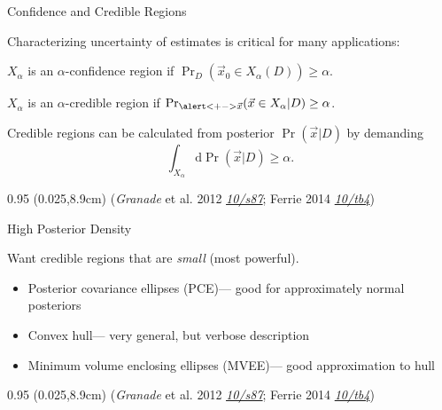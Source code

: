 \documentclass[xcolor=dvipsnames, compress]{beamer}
\renewcommand\UrlFont{\color{red}\rmfamily\itshape}
\newcommand{\shortdoi}[1]{\href{http://doi.org/#1}{\UrlFont 10/#1}}
\newcommand{\dd}{\mathrm{d}}
\newcommand{\bottomnote}[1]{
  \begin{textblock*}{0.95\paperwidth} (0.025\paperwidth,8.9cm)
    {\tiny \hfill #1}
  \end{textblock*}
}
\begin{document}
\begin{frame}{Confidence and Credible Regions}

    Characterizing uncertainty of estimates is critical
    for many applications:

    \begin{definition}
      $X_\alpha$ is an $\alpha$-confidence region if $\Pr_D(\vec{x}_0 \in X_\alpha(D)) \ge \alpha$.
    \end{definition}

    \begin{definition}
      $X_\alpha$ is an $\alpha$-credible region if $\Pr_{\alert<+->{\vec{x}}}(\vec{x} \in X_\alpha | D) \ge \alpha$.
    \end{definition}

    Credible regions can be calculated from posterior $\Pr(\vec{x} | D)$
    by demanding
    $$
      \int_{X_\alpha} \dd\Pr(\vec{x} | D) \ge \alpha.
    $$

  \bottomnote{(\emph{Granade} et al. 2012 \shortdoi{s87}; Ferrie 2014 \shortdoi{tb4})}

\end{frame}

\begin{frame}{High Posterior Density}

  Want credible regions that are \emph{small} (most powerful).

  \begin{itemize}
    \item Posterior covariance ellipses (PCE)--- good for approximately normal posteriors
    \item Convex hull--- very general, but verbose description
    \item Minimum volume enclosing ellipses (MVEE)--- good approximation to hull
  \end{itemize}

  \bottomnote{(\emph{Granade} et al. 2012 \shortdoi{s87}; Ferrie 2014 \shortdoi{tb4})}

\end{frame}
\end{document}
